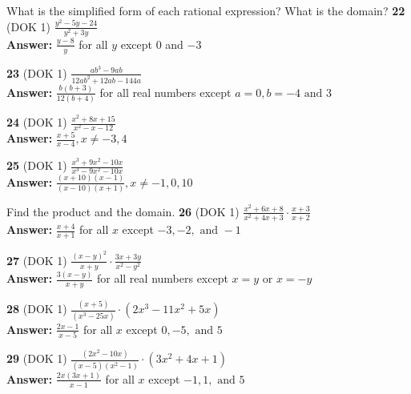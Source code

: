 \documentclass{article}
\newenvironment{practice}[2]{\textbf{#1} (DOK #2)}{}
\newcommand{\answer}[1]{\textbf{Answer:} #1}
\begin{document}
What is the simplified form of each rational expression? What is the domain?
\begin{practice}{22}{1}
$\frac{y^2 - 5y - 24}{y^2 + 3y}$ \\
\answer{$\frac{y - 8}{y}$ for all $y$ except $0$ and $-3$}
\end{practice}

\begin{practice}{23}{1}
$\frac{ab^3 - 9ab}{12ab^2 + 12ab - 144a}$ \\
\answer{$\frac{b(b+3)}{12(b+4)}$ for all real numbers except $a = 0, b = -4 \text{ and } 3$}
\end{practice}

\begin{practice}{24}{1}
$\frac{x^2 + 8x + 15}{x^2 - x - 12}$ \\
\answer{$\frac{x+5}{x-4}, x \neq -3, 4$}
\end{practice}

\begin{practice}{25}{1}
$\frac{x^3 + 9x^2 - 10x}{x^3 - 9x^2 - 10x}$ \\
\answer{$\frac{(x+10)(x-1)}{(x-10)(x+1)}, x \neq -1, 0, 10$}
\end{practice}

Find the product and the domain.
\begin{practice}{26}{1}
$\frac{x^2 + 6x + 8}{x^2 + 4x + 3} \cdot \frac{x + 3}{x + 2}$ \\
\answer{$\frac{x+4}{x+1}$ for all $x$ except $-3, -2, \text{ and } -1$}
\end{practice}

\begin{practice}{27}{1}
$\frac{(x - y)^2}{x + y} \cdot \frac{3x + 3y}{x^2 - y^2}$ \\
\answer{$\frac{3(x-y)}{x+y}$ for all real numbers except $x = y \text{ or } x = -y$}
\end{practice}

\begin{practice}{28}{1}
$\frac{(x + 5)}{(x^3 - 25x)} \cdot (2x^3 - 11x^2 + 5x)$ \\
\answer{$\frac{2x-1}{x-5}$ for all $x$ except $0, -5, \text{ and } 5$}
\end{practice}

\begin{practice}{29}{1}
$\frac{(2x^2 - 10x)}{(x - 5)(x^2 - 1)} \cdot (3x^2 + 4x + 1)$ \\
\answer{$\frac{2x(3x+1)}{x-1}$ for all $x$ except $-1, 1, \text{ and } 5$}
\end{practice}
\end{document}
